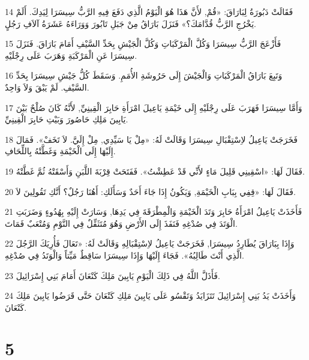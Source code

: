 \par 14 فَقَالَتْ دَبُورَةُ لِبَارَاقَ: «قُمْ, لأَنَّ هَذَا هُوَ الْيَوْمُ الَّذِي دَفَعَ فِيهِ الرَّبُّ سِيسَرَا لِيَدِكَ. أَلَمْ يَخْرُجِ الرَّبُّ قُدَّامَكَ؟» فَنَزَلَ بَارَاقُ مِنْ جَبَلِ تَابُورَ وَوَرَاءَهُ عَشَرَةُ آلاَفِ رَجُلٍ.
\par 15 فَأَزْعَجَ الرَّبُّ سِيسَرَا وَكُلَّ الْمَرْكَبَاتِ وَكُلَّ الْجَيْشِ بِحَدِّ السَّيْفِ أَمَامَ بَارَاقَ. فَنَزَلَ سِيسَرَا عَنِ الْمَرْكَبَةِ وَهَرَبَ عَلَى رِجْلَيْهِ.
\par 16 وَتَبِعَ بَارَاقُ الْمَرْكَبَاتِ وَالْجَيْشَ إِلَى حَرُوشَةِ الأُمَمِ. وَسَقَطَ كُلُّ جَيْشِ سِيسَرَا بِحَدِّ السَّيْفِ. لَمْ يَبْقَ وَلاَ وَاحِدٌ.
\par 17 وَأَمَّا سِيسَرَا فَهَرَبَ عَلَى رِجْلَيْهِ إِلَى خَيْمَةِ يَاعِيلَ امْرَأَةِ حَابِرَ الْقِينِيِّ, لأَنَّهُ كَانَ صُلْحٌ بَيْنَ يَابِينَ مَلِكِ حَاصُورَ وَبَيْتِ حَابِرَ الْقِينِيِّ.
\par 18 فَخَرَجَتْ يَاعِيلُ لاِسْتِقْبَالِ سِيسَرَا وَقَالَتْ لَهُ: «مِلْ يَا سَيِّدِي, مِلْ إِلَيَّ. لاَ تَخَفْ». فَمَالَ إِلَيْهَا إِلَى الْخَيْمَةِ وَغَطَّتْهُ بِاللِّحَافِ.
\par 19 فَقَالَ لَهَا: «اسْقِينِي قَلِيلَ مَاءٍ لأَنِّي قَدْ عَطِشْتُ». فَفَتَحَتْ قِرْبَةَ اللَّبَنِ وَأَسْقَتْهُ ثُمَّ غَطَّتْهُ.
\par 20 فَقَالَ لَهَا: «قِفِي بِبَابِ الْخَيْمَةِ, وَيَكُونُ إِذَا جَاءَ أَحَدٌ وَسَأَلَكِ: أَهُنَا رَجُلٌ؟ أَنَّكِ تَقُولِينَ لاَ.
\par 21 فَأَخَذَتْ يَاعِيلُ امْرَأَةُ حَابِرَ وَتَدَ الْخَيْمَةِ وَالْمِطْرَقَةَ فِي يَدِهَا, وَسَارَتْ إِلَيْهِ بِهُدُوءٍ وَضَرَبَتِ الْوَتَدَ فِي صُدْغِهِ فَنَفَذَ إِلَى الأَرْضِ وَهُوَ مُتَثَقِّلٌ فِي النَّوْمِ وَمُتْعَبٌ فَمَاتَ.
\par 22 وَإِذَا بِبَارَاقَ يُطَارِدُ سِيسَرَا, فَخَرَجَتْ يَاعِيلُ لاِسْتِقْبَالِهِ وَقَالَتْ لَهُ: «تَعَالَ فَأُرِيَكَ الرَّجُلَ الَّذِي أَنْتَ طَالِبُهُ». فَجَاءَ إِلَيْهَا وَإِذَا سِيسَرَا سَاقِطٌ مَيِّتاً وَالْوَتَدُ فِي صُدْغِهِ.
\par 23 فَأَذَلَّ اللَّهُ فِي ذَلِكَ الْيَوْمِ يَابِينَ مَلِكَ كَنْعَانَ أَمَامَ بَنِي إِسْرَائِيلَ.
\par 24 وَأَخَذَتْ يَدُ بَنِي إِسْرَائِيلَ تَتَزَايَدُ وَتَقْسُو عَلَى يَابِينَ مَلِكِ كَنْعَانَ حَتَّى قَرَضُوا يَابِينَ مَلِكَ كَنْعَانَ.

\chapter{5}

